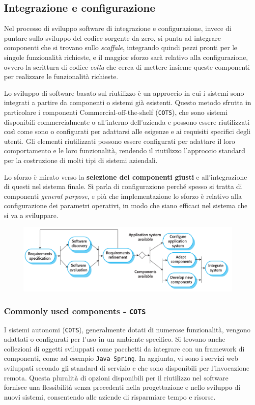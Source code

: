 \subsection{Integrazione e configurazione}
Nel processo di sviluppo software di integrazione e configurazione, 
invece di puntare sullo sviluppo del codice sorgente da zero, si punta ad integrare 
componenti che si trovano sullo \textit{scaffale}, integrando quindi pezzi pronti
per le singole funzionalità richieste, e il maggior sforzo sarà relativo alla 
configurazione, ovvero la scrittura di codice \textit{colla} che cerca di mettere
insieme queste componenti per realizzare le funzionalità richieste.

Lo sviluppo di software basato sul riutilizzo è un approccio in cui i sistemi
sono integrati a partire da componenti o sistemi già esistenti. Questo metodo
sfrutta in particolare i componenti Commercial-off-the-shelf (\texttt{COTS}),
che sono sistemi disponibili commercialmente o all'interno dell'azienda
e possono essere riutilizzati così
come sono o configurati per adattarsi alle esigenze e ai requisiti specifici degli
utenti. Gli elementi riutilizzati possono essere configurati per adattare il loro
comportamento e le loro funzionalità, rendendo il riutilizzo l'approccio standard
per la costruzione di molti tipi di sistemi aziendali.

Lo sforzo è mirato verso la \textbf{selezione dei componenti giusti} e all'integrazione 
di questi nel sistema finale.
Si parla di configurazione perché spesso si tratta di componenti \textit{general purpose},
e più che implementazione lo sforzo è relativo alla configurazione dei parametri operativi,
in modo che siano efficaci nel sistema che si va a sviluppare.

\begin{figure}[H]
    \centering
    \includegraphics[scale=0.4]{img/integr_config.png}
\end{figure}

\subsubsection{Commonly used components - \texttt{COTS}}
I sistemi autonomi (\texttt{COTS}), generalmente dotati di numerose funzionalità, vengono
adattati o configurati per l'uso in un ambiente specifico. Si trovano anche collezioni
di oggetti sviluppati come pacchetti da integrare con un framework di componenti,
come ad esempio \texttt{Java Spring}. In aggiunta, vi sono i servizi web sviluppati secondo
gli standard di servizio e che sono disponibili per l'invocazione remota. Questa
pluralità di opzioni disponibili per il riutilizzo nel software fornisce una
flessibilità senza precedenti nella progettazione e nello sviluppo di nuovi sistemi,
consentendo alle aziende di risparmiare tempo e risorse.
